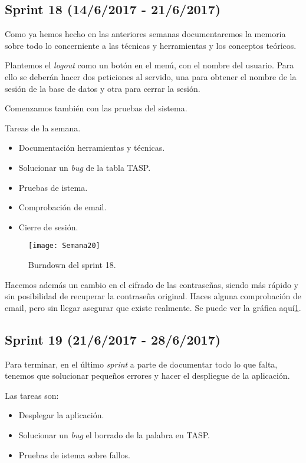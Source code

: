 \subsection{Sprint 18 (14/6/2017 - 21/6/2017)}

Como ya hemos hecho en las anteriores semanas documentaremos la memoria sobre todo lo concerniente a las técnicas y herramientas y los conceptos teóricos.

Plantemos el \emph{logout} como un botón en el menú, con el nombre del usuario. Para ello se deberán hacer dos peticiones al servido, una para obtener el nombre de la sesión de la base de datos y otra para cerrar la sesión. 

Comenzamos también con las pruebas del sistema.

Tareas de la semana.
\begin{itemize}
\item Documentación herramientas y técnicas.
\item Solucionar un \emph{bug} de la tabla TASP.
\item Pruebas de istema.
\item Comprobación de email.
\item Cierre de sesión.
\end{itemize}

\begin{figure}[h]
\centering
\texttt{[image: Semana20]}
\caption{Burndown del sprint 18.}
\label{fig:A.17}
\end{figure}

Hacemos además un cambio en el cifrado de las contraseñas, siendo más rápido y sin posibilidad de recuperar la contraseña original. Haces alguna comprobación de email, pero sin llegar asegurar que existe realmente. Se puede ver la gráfica aquí\ref{fig:A.17}.

\subsection{Sprint 19 (21/6/2017 - 28/6/2017)}

Para terminar, en el último \emph{sprint} a parte de documentar todo lo que falta, tenemos que solucionar pequeños errores y hacer el despliegue de la aplicación.

Las tareas son:
\begin{itemize}
\item Desplegar la aplicación.
\item Solucionar un \emph{bug} el borrado de la palabra en TASP.
\item Pruebas de istema sobre fallos.
\end{itemize}

